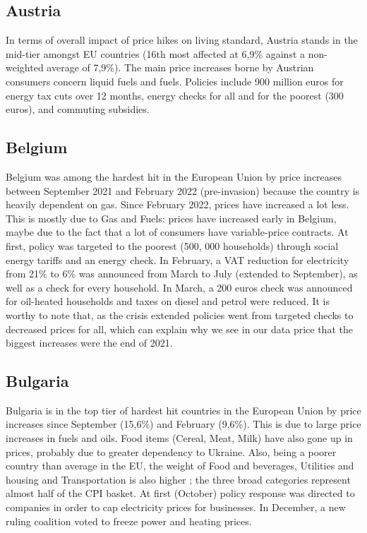 \documentclass[
  9pt,
  a4paper,
  numbers=noendperiod,
  DIV=12]{scrartcl}
\begin{document}
\hypertarget{austria}{%
\subsection{Austria}\label{austria}}

In terms of overall impact of price hikes on living standard, Austria
stands in the mid-tier amongst EU countries (16th most affected at 6,9\%
against a non-weighted average of 7,9\%). The main price increases borne
by Austrian consumers concern liquid fuels and fuels. Policies include
900 million euros for energy tax cuts over 12 months, energy checks for
all and for the poorest (300 euros), and commuting subsidies.

\hypertarget{belgium}{%
\subsection{Belgium}\label{belgium}}

Belgium was among the hardest hit in the European Union by price
increases between September 2021 and February 2022 (pre-invasion)
because the country is heavily dependent on gas. Since February 2022,
prices have increased a lot less. This is mostly due to Gas and Fuels:
prices have increased early in Belgium, maybe due to the fact that a lot
of consumers have variable-price contracts. At first, policy was
targeted to the poorest (500, 000 households) through social energy
tariffs and an energy check. In February, a VAT reduction for
electricity from 21\% to 6\% was announced from March to July (extended
to September), as well as a check for every household. In March, a 200
euros check was announced for oil-heated households and taxes on diesel
and petrol were reduced. It is worthy to note that, as the crisis
extended policies went from targeted checks to decreased prices for all,
which can explain why we see in our data price that the biggest
increases were the end of 2021.

\hypertarget{bulgaria}{%
\subsection{Bulgaria}\label{bulgaria}}

Bulgaria is in the top tier of hardest hit countries in the European
Union by price increases since September (15,6\%) and February (9,6\%).
This is due to large price increases in fuels and oils. Food items
(Cereal, Meat, Milk) have also gone up in prices, probably due to
greater dependency to Ukraine. Also, being a poorer country than average
in the EU, the weight of Food and beverages, Utilities and housing and
Transportation is also higher ; the three broad categories represent
almost half of the CPI basket. At first (October) policy response was
directed to companies in order to cap electricity prices for businesses.
In December, a new ruling coalition voted to freeze power and heating
prices.
\end{document}
